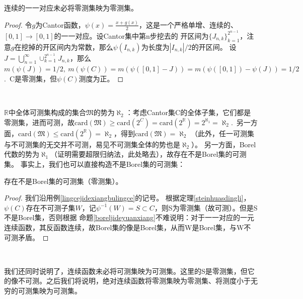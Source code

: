 \documentclass[color=green,thmcnt=section,lang=cn,12pt]{elegantbook}
\numberwithin{equation}{section}%
\numberwithin{figure}{section}%
\newcommand{\RR}{\mathbb{R}}
\newcommand{\cu}[1]{\bigcup_{#1=1}^{\infty}} %
\begin{document}
\begin{example}\label{lingcejidexiangbulingce}
    连续的一一对应未必将零测集映为零测集。    
\end{example}
\begin{proof}
    令$g$为Cantor函数，$\psi(x)=\frac{x+g(x)}{2}$，这是一个严格单增、连续的、$[0,1]\to [0,1]$的一一对应。设Cantor集中第n步挖去的
    开区间为$\{J_{n,k}\}_{k=1}^{2^{n-1}}$，注意$g$在挖掉的开区间内为常数，那么$\psi(I_{n,k})$为长度为$|I_{n,k}|/2$的开区间。
    设$J=\cu{n}\cup_{k=1}^{2^{n-1}}J_{n,k}$，那么$m(\psi(J))=1/2,\ m(\psi(C))=m(\psi([0,1]-J))=m(\psi([0,1])-\psi(J))=1/2$.\ 
    C是零测集，但$\psi(C)$测度为正。
\end{proof}
\ 


$\RR$中全体可测集构成的集合$\mathfrak{M}$的势为$\aleph_2$：考虑Cantor集C的全体子集，它们都是零测集，进而可测，故$\textrm{card}(\mathfrak{M})\geq \textrm{card}(2^C)=\textrm{card}(2^\RR)=2^{\aleph_1}=\aleph_2$.\ 
另一方面，$\textrm{card}(\mathfrak{M})\leq \textrm{card}(2^\RR)=\aleph_2$，得到$\textrm{card}(\mathfrak{M})=\aleph_2$
（此外，任一可测集与不可测集的无交并不可测，易见不可测集全体的势也是$\aleph_2$）。
另一方面，Borel代数的势为$\aleph_1$（证明需要超限归纳法，此处略去），故存在不是Borel集的可测集。
事实上，我们也可以直接构造不是Borel集的可测集：\\


\begin{example}\label{feiboreljidekeceji}
    存在不是Borel集的可测集（零测集）。
\end{example}
\begin{proof}
    我们沿用例\ref{lingcejidexiangbulingce}的记号。
    根据定理\ref{steinhuasdingli}，$\psi(C)$存在不可测子集$W$，记$\psi^{-1}(W)=S\subset C$，则S为零测集（故可测）。但是S不是Borel集，否则根据
    命题\ref{boreljideyuanxiang}不难说明：对于一一对应的一元连续函数，其反函数连续，故Borel集的像是Borel集，从而W是Borel集，与W不可测矛盾。
\end{proof}
\


\begin{remark}
    我们还同时说明了，连续函数未必将可测集映为可测集。这里的S是零测集，但它的像不可测。之后我们将说明，绝对连续函数将零测集映为零测集、将测度小于无穷的可测集映为可测集。
\end{remark}
\ 
\end{document}
